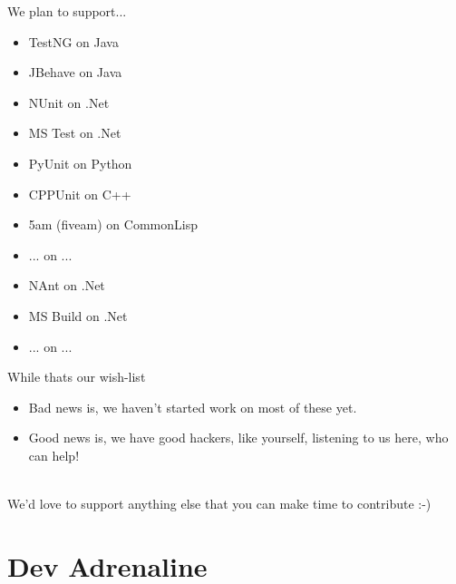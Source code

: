 \documentclass{beamer}
\begin{document}
\begin{frame}{We plan to support...}
  \begin{centering}
    \begin{multicols}{2}
      \begin{itemize}
      \item {\color{green}TestNG} on {\color{blue}Java}
      \item {\color{green}JBehave} on {\color{blue}Java}
      \item {\color{green}NUnit} on {\color{blue}.Net}
      \item {\color{green}MS Test} on {\color{blue}.Net}
      \item {\color{green}PyUnit} on {\color{blue}Python}
      \item {\color{green}CPPUnit} on {\color{blue} C++}
      \item {\color{green}5am (fiveam)} on {\color{blue} CommonLisp}
      \item {\color{green} ...} on {\color{blue} ...}
      \end{itemize}
      \begin{itemize}
      \item {\color{red}NAnt} on {\color{blue}.Net}
      \item {\color{red}MS Build} on {\color{blue}.Net}
      \item {\color{red}...} on {\color{blue}...}
      \end{itemize}
    \end{multicols}
  \end{centering}
\end{frame}

\begin{frame}{While thats our wish-list}
  \begin{center}
    \begin{itemize}
    \item Bad news is, we haven't started work on most of these yet.\\
      \pause
    \item Good news is, we have good hackers, like yourself, listening to us here, who can help!
    \end{itemize}
    \pause
    \quad\\
    We'd love to support anything else that you can make time to contribute :-)
  \end{center}
\end{frame}

\section{Dev Adrenaline}
\end{document}
